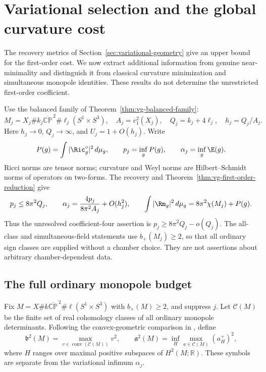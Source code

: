 \section{Variational selection and the global curvature cost}
\label{sec:variational-selection-global-cost}

The recovery metrics of Section~\ref{sec:variational-geometry} give an
upper bound for the first-order cost.  We now extract additional
information from genuine near-minimality and distinguish it from
classical curvature minimization and simultaneous monopole identities.
These results do not determine the unrestricted first-order coefficient.

Use the balanced family of Theorem~\ref{thm:vg-balanced-family}:
\begin{equation}\label{webvar:family}
 M_j=X_j\#k_j\overline{\mathbb{CP}}^{\,2}\#\ell_j(S^1\times S^3),
 \quad A_j=c_1^2(X_j),\quad Q_j=k_j+4\ell_j,\quad h_j=Q_j/A_j.
\end{equation}
Here $h_j\to0$, $Q_j\to\infty$, and $U_j=1+O(h_j)$.  Write
\begin{equation}\label{webvar:infima}
 P(g)=\int|\Ric_g^\circ|^2\,d\mu_g,\qquad
 p_j=\inf_gP(g),\qquad \alpha_j=\inf_g\E(g).
\end{equation}
Ricci norms are tensor norms; curvature and Weyl norms are
Hilbert--Schmidt norms of operators on two-forms.  The recovery and
Theorem~\ref{thm:vg-first-order-reduction} give
\begin{equation}\label{webvar:reduction}
 p_j\le8\pi^2Q_j,\qquad
 \alpha_j=\frac{4p_j}{8\pi^2A_j}+O(h_j^2),\qquad
 \int|\Rm_g|^2\,d\mu_g=8\pi^2\chi(M_j)+P(g).
\end{equation}
Thus the unresolved coefficient-four assertion is
$p_j\ge8\pi^2Q_j-o(Q_j)$.  The all-class and simultaneous-field
statements use $b_+(M_j)\ge2$, so that all ordinary sign classes
are supplied without a chamber choice.  They are not assertions
about arbitrary chamber-dependent data.

\subsection{The full ordinary monopole budget}

Fix $M=X\#k\overline{\mathbb{CP}}^{\,2}\#\ell(S^1\times S^3)$
with $b_+(M)\ge2$, and suppress $j$.  Let $\mathcal C(M)$ be the
finite set of real cohomology classes of all ordinary monopole
determinants.  Following the convex-geometric comparison in
\cite{LeBrunConvex}, define
\begin{equation}\label{webvar:all-class-definitions}
 \mathfrak b^2(M)=\max_{v\in\operatorname{conv}(\mathcal C(M))}v^2,
 \qquad
 \mathfrak a^2(M)=\inf_H\max_{a\in\mathcal C(M)}(a_H^+)^2,
\end{equation}
where $H$ ranges over maximal positive subspaces of $H^2(M;\mathbb R)$.
These symbols are separate from the variational infimum $\alpha_j$.

